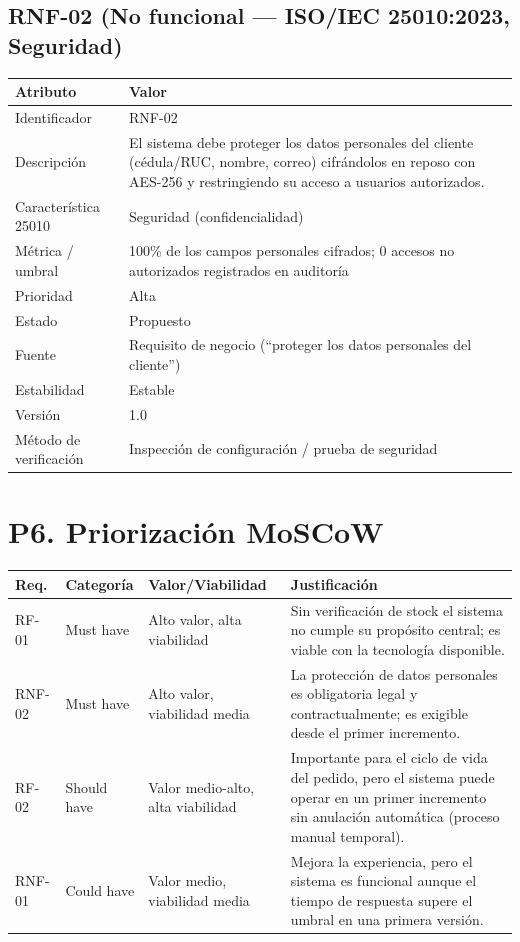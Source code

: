 \documentclass[11pt,letterpaper]{article}
\begin{document}
\subsection*{RNF-02 (No funcional --- ISO/IEC 25010:2023, Seguridad)}
\begin{center}\small
\begin{tabular}{lp{10.5cm}}
\toprule
\textbf{Atributo} & \textbf{Valor} \\
\midrule
Identificador & RNF-02 \\
Descripción & El sistema debe proteger los datos personales del cliente (cédula/RUC, nombre, correo) cifrándolos en reposo con AES-256 y restringiendo su acceso a usuarios autorizados. \\
Característica 25010 & Seguridad (confidencialidad) \\
Métrica / umbral & 100\% de los campos personales cifrados; 0 accesos no autorizados registrados en auditoría \\
Prioridad & Alta \\
Estado & Propuesto \\
Fuente & Requisito de negocio (``proteger los datos personales del cliente'') \\
Estabilidad & Estable \\
Versión & 1.0 \\
Método de verificación & Inspección de configuración / prueba de seguridad \\
\bottomrule
\end{tabular}
\end{center}

\section{P6. Priorización MoSCoW}

\begin{center}\small
\begin{tabular}{lll p{6.5cm}}
\toprule
\textbf{Req.} & \textbf{Categoría} & \textbf{Valor/Viabilidad} & \textbf{Justificación} \\
\midrule
RF-01 & Must have & Alto valor, alta viabilidad & Sin verificación de stock el sistema no cumple su propósito central; es viable con la tecnología disponible. \\
RNF-02 & Must have & Alto valor, viabilidad media & La protección de datos personales es obligatoria legal y contractualmente; es exigible desde el primer incremento. \\
RF-02 & Should have & Valor medio-alto, alta viabilidad & Importante para el ciclo de vida del pedido, pero el sistema puede operar en un primer incremento sin anulación automática (proceso manual temporal). \\
RNF-01 & Could have & Valor medio, viabilidad media & Mejora la experiencia, pero el sistema es funcional aunque el tiempo de respuesta supere el umbral en una primera versión. \\
\bottomrule
\end{tabular}
\end{center}
\end{document}
